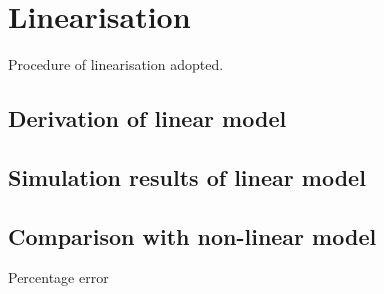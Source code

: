 \section{Linearisation}
Procedure of linearisation adopted. 
\subsection{Derivation of linear model}
\subsection{Simulation results of linear model}
\subsection{Comparison with non-linear model}
Percentage error